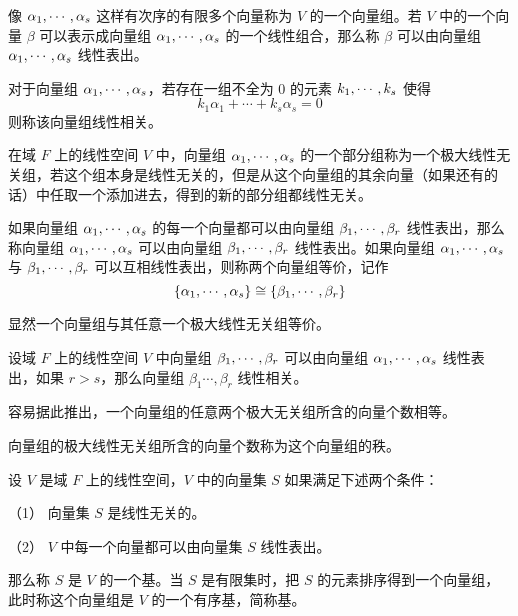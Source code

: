 像 $\alpha_1,\cdots,\alpha_s$ 这样有次序的有限多个向量称为 $V$ 的一个向量组。若 $V$ 中的一个向量 $\beta$ 可以表示成向量组 $\alpha_1,\cdots,\alpha_s$ 的一个线性组合，那么称 $\beta$ 可以由向量组 $\alpha_1,\cdots,\alpha_s$ 线性表出。

\begin{definition}[线性相关]
    对于向量组 $\alpha_1,\cdots,\alpha_s$，若存在一组不全为 $0$ 的元素 $k_1,\cdots,k_s$ 使得
    \[ k_1\alpha_1 + \cdots + k_s\alpha_s = 0 \]
    则称该向量组线性相关。
\end{definition}

\begin{definition}
    在域 $F$ 上的线性空间 $V$ 中，向量组 $\alpha_1,\cdots,\alpha_s$ 的一个部分组称为一个极大线性无关组，若这个组本身是线性无关的，但是从这个向量组的其余向量（如果还有的话）中任取一个添加进去，得到的新的部分组都线性无关。
\end{definition}

\begin{definition}
    如果向量组 $\alpha_1,\cdots,\alpha_s$ 的每一个向量都可以由向量组 $\beta_1,\cdots,\beta_r$ 线性表出，那么称向量组 $\alpha_1,\cdots,\alpha_s$ 可以由向量组 $\beta_1,\cdots,\beta_r$ 线性表出。如果向量组 $\alpha_1,\cdots,\alpha_s$ 与 $\beta_1,\cdots,\beta_r$ 可以互相线性表出，则称两个向量组等价，记作
    \[ \{ \alpha_1, \cdots,\alpha_s \} \cong \{\beta_1,\cdots,\beta_r\}\]
\end{definition}

显然一个向量组与其任意一个极大线性无关组等价。

\begin{theorem}
    设域 $F$ 上的线性空间 $V$ 中向量组 $\beta_1,\cdots,\beta_r$ 可以由向量组 $\alpha_1,\cdots,\alpha_s$ 线性表出，如果 $r>s$，那么向量组 $\beta_1\cdots,\beta_r$ 线性相关。
\end{theorem}

容易据此推出，一个向量组的任意两个极大无关组所含的向量个数相等。

\begin{definition}
    向量组的极大线性无关组所含的向量个数称为这个向量组的秩。
\end{definition}

\begin{definition}
    设 $V$ 是域 $F$ 上的线性空间，$V$ 中的向量集 $S$ 如果满足下述两个条件：
    
    （1） 向量集 $S$ 是线性无关的。
    
    （2） $V$ 中每一个向量都可以由向量集 $S$ 线性表出。
    
    那么称 $S$ 是 $V$ 的一个基。当 $S$ 是有限集时，把 $S$ 的元素排序得到一个向量组，此时称这个向量组是 $V$ 的一个有序基，简称基。
\end{definition}

